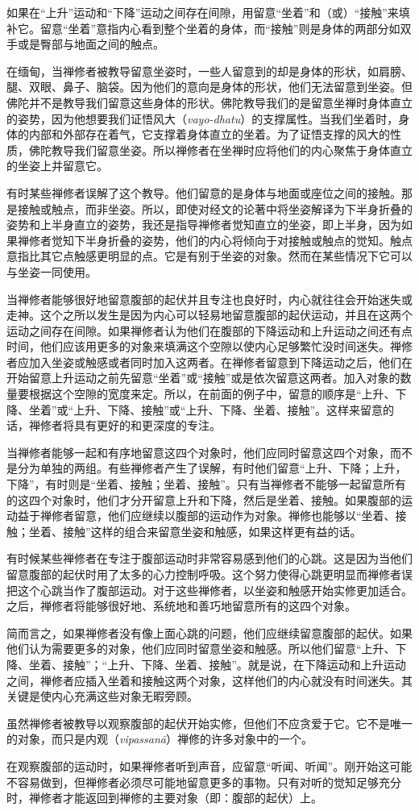 如果在“上升”运动和“下降”运动之间存在间隙，用留意“坐着”和（或）“接触”来填补它。留意“坐着”意指内心看到整个坐着的身体，而“接触”则是身体的两部分如双手或是臀部与地面之间的触点。

在缅甸，当禅修者被教导留意坐姿时，一些人留意到的却是身体的形状，\1如肩膀、腿、双眼、鼻子、脑袋。因为他们的意向是身体的形状，他们无法留意到坐姿。但佛陀并不是教导我们留意这些身体的形状。佛陀教导我们的是留意坐禅时身体直立的姿势，因为他想要我们证悟风大（{\it vayo-dhatu}）的支撑属性。当我们坐着时，身体的内部和外部存在着气，它支撑着身体直立的坐着。为了证悟支撑的风大的性质，佛陀教导我们留意坐姿。所以禅修者在坐禅时应将他们的内心聚焦于身体直立的坐姿上并留意它。

有时某些禅修者误解了这个教导。他们留意的是身体与地面或座位之间的接触。那是接触或触点，而非坐姿。所以，即使对经文的论著中将坐姿解译为下半身折叠的姿势和上半身直立的姿势，我还是指导禅修者觉知直立的坐姿，即上半身，因为如果禅修者觉知下半身折叠的姿势，他们的内心将倾向于对接触或触点的觉知。触点意指比其它点触感更明显的点。它是有别于坐姿的对象。然而在某些情况下它可以与坐姿一同使用。

当禅修者能够很好地留意腹部的起伏并且专注也良好时，内心就往往会开始迷失或走神。这个之所以发生是因为内心可以轻易地留意腹部的起伏运动，并且在这两个运动之间存在间隙。如果禅修者认为他们\1在腹部的下降运动和上升运动之间还有点时间，他们应该用更多的对象来填满这个空隙以使内心足够繁忙没时间迷失。禅修者应加入坐姿或触感或者同时加入这两者。在禅修者留意到下降运动之后，他们在开始留意上升运动之前先留意“坐着”或“接触”或是依次留意这两者。加入对象的数量要根据这个空隙的宽度来定。所以，在前面的例子中，留意的顺序是“上升、下降、坐着”或“上升、下降、接触”或“上升、下降、坐着、接触”。这样来留意的话，禅修者将具有更好的和更深度的专注。

当禅修者能够一起和有序地留意这四个对象时，他们应同时留意这四个对象，而不是分为单独的两组。有些禅修者产生了误解，有时他们留意“上升、下降；上升，下降”，有时则是“坐着、接触；坐着、接触”。只有当禅修者不能够一起留意所有的这四个对象时，他们才分开留意上升和下降，然后是坐着、接触。如果腹部的运动益于禅修者留意，他们应继续以腹部的运动作为对象。禅修也能够以“坐着、接触；坐着、接触”这样的组合来留意坐姿和触感，如果这样更有益的话。

有时候某些禅修者在专注于腹部运动时非常容易感到他们的心跳。这是因为当他们留意腹部的起伏时用了太多的心力控制呼吸。这个努力使得心跳更明显而禅修者误把这个心跳当作了腹部运动。对于这些禅修者，以坐姿和触感\1开始实修更加适合。之后，禅修者将能够很好地、系统地和善巧地留意所有的这四个对象。

简而言之，如果禅修者没有像上面心跳的问题，他们应继续留意腹部的起伏。如果他们认为需要更多的对象，他们应同时留意坐姿和触感。所以他们留意“上升、下降、坐着、接触”；“上升、下降、坐着、接触”。就是说，在下降运动和上升运动之间，禅修者应插入坐着和接触这两个对象，这样他们的内心就没有时间迷失。其关键是使内心充满这些对象无暇旁顾。

虽然禅修者被教导以观察腹部的起伏开始实修，但他们不应贪爱于它。它不是唯一的对象，而只是内观（{\it vipassan\=a}）禅修的许多对象中的一个。

在观察腹部的运动时，如果禅修者听到声音，应留意“听闻、听闻”。刚开始这可能不容易做到，但禅修者必须尽可能地留意更多的事物。只有对听的觉知足够充分时，禅修者才能返回到禅修的主要对象（即：腹部的起伏）上。

\endchapter

\byebye
